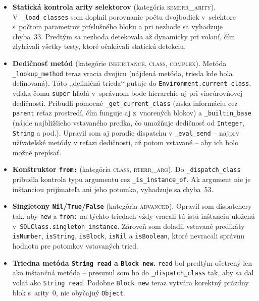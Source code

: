 \documentclass[a4paper, 11pt]{article}
\begin{document}
\begin{itemize}[nosep]
    \item \textbf{Statická kontrola arity selektorov} (kategória
    \textsc{semerr\_arity}). V~\texttt{\_load\_classes} som doplnil
    porovnanie počtu dvojbodiek v~selektore s~počtom parametrov príslušného
    bloku a pri nezhode sa vyhadzuje chyba~33. Predtým sa nezhoda
    detekovala až dynamicky pri volaní, čím zlyhávali všetky testy, ktoré
    očakávali statickú detekciu.
    \item \textbf{Dedičnosť metód} (kategórie \textsc{inheritance},
    \textsc{class}, \textsc{complex}). Metóda \texttt{\_lookup\_method} teraz
    vracia dvojicu (nájdená metóda, trieda kde bola definovaná). Táto
    ,,definičná trieda`` putuje do \texttt{Environment.current\_class},
    vďaka čomu \texttt{super} hľadá v~správnom bode hierarchie aj pri
    viacúrovňovej dedičnosti. Pribudli pomocné
    \texttt{\_get\_current\_class} (získa informáciu cez \texttt{parent}
    reťaz prostredí, čím funguje aj z~vnorených blokov)
    a \texttt{\_builtin\_base} (nájde najbližšieho vstavaného predka,
    čo umožňuje dedičnosť od \texttt{Integer}, \texttt{String} a pod.).
    Upravil som aj poradie dispatchu v \texttt{\_eval\_send} -- najprv
    užívateľské metódy v reťazi dedičnosti, až potom vstavané -- aby ich
    bolo možné prepísať.
    \item \textbf{Konštruktor \texttt{from:}} (kategória \textsc{class},
    \textsc{rterr\_arg}). Do \texttt{\_dispatch\_class} pribudla kontrola
    typu argumentu cez \texttt{\_is\_instance\_of}. Ak argument nie je
    inštanciou prijímateľa ani jeho potomka, vyhadzuje sa chyba~53.
    \item \textbf{Singletony \texttt{Nil}/\texttt{True}/\texttt{False}}
    (kategória \textsc{advanced}). Opravil som dispatchery tak, aby
    \texttt{new} a \texttt{from:} na týchto triedach vždy vracali tú istú
    inštanciu uloženú v~\texttt{SOLClass.singleton\_instance}. Zároveň
    som doladil vstavané predikáty \texttt{isNumber}, \texttt{isString},
    \texttt{isBlock}, \texttt{isNil} a \texttt{isBoolean}, ktoré
    nevracali správnu hodnotu pre potomkov vstavaných tried.
    \item \textbf{Triedna metóda \texttt{String read} a \texttt{Block new}.}
    \texttt{read} bol predtým ošetrený len ako inštančná metóda --
    presunul som ho do \texttt{\_dispatch\_class} tak, aby sa dal volať
    ako \texttt{String read}. Podobne \texttt{Block new} teraz vytvára
    korektný prázdny blok s~arity~0, nie obyčajný \texttt{Object}.
\end{itemize}
\end{document}
